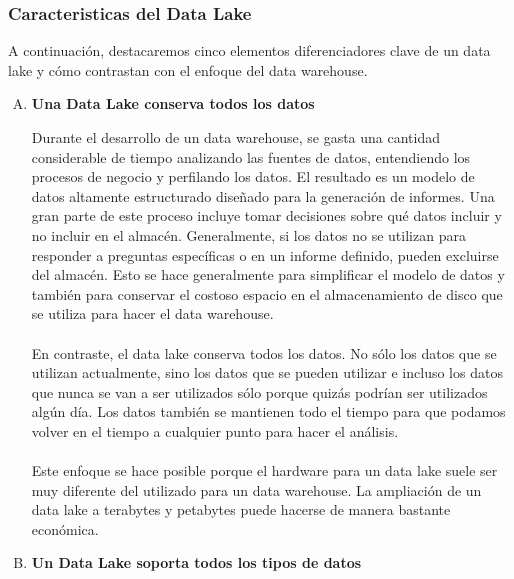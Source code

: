 \documentclass[11pt,a4paper]{article}
\begin{document}
\subsubsection{Caracteristicas del Data Lake}
			
				A continuación, destacaremos cinco elementos diferenciadores clave de un data lake y cómo contrastan con el enfoque del data warehouse.
			
			\begin{enumerate}[A.]
				\item \textbf{Una Data Lake conserva todos los datos}
				
				Durante el desarrollo de un data warehouse, se gasta una cantidad considerable de tiempo analizando las fuentes de datos, entendiendo los procesos de negocio y perfilando los datos. El resultado es un modelo de datos altamente estructurado diseñado para la generación de informes. Una gran parte de este proceso incluye tomar decisiones sobre qué datos incluir y no incluir en el almacén. Generalmente, si los datos no se utilizan para responder a preguntas específicas o en un informe definido, pueden excluirse del almacén. Esto se hace generalmente para simplificar el modelo de datos y también para conservar el costoso espacio en el almacenamiento de disco que se utiliza para hacer el data warehouse.\\
				\\
				En contraste, el data lake conserva todos los datos. No sólo los datos que se utilizan actualmente, sino los datos que se pueden utilizar e incluso los datos que nunca se van a ser utilizados sólo porque quizás podrían ser utilizados algún día. Los datos también se mantienen todo el tiempo para que podamos volver en el tiempo a cualquier punto para hacer el análisis.\\
				\\
				Este enfoque se hace posible porque el hardware para un data lake suele ser muy diferente del utilizado para un data warehouse. La ampliación de un data lake a terabytes y petabytes puede hacerse de manera bastante económica.
\item \textbf{Un Data Lake soporta todos los tipos de datos}
				

\end{enumerate}
\end{document}
